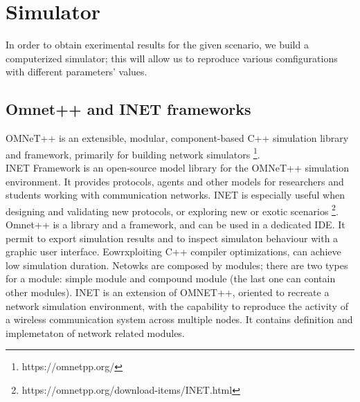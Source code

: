 %
\chapter{Simulator}
In order to obtain exerimental results for the given scenario, we build a computerized simulator;
this will allow us to reproduce various comfigurations with different parameters' values.\\
\section{Omnet++ and INET frameworks}
OMNeT++ is an extensible, modular, component-based C++ simulation library and framework, 
primarily for building network simulators \footnote{https://omnetpp.org/}.\\
INET Framework is an open-source model library for the OMNeT++ simulation environment. 
It provides protocols, agents and other models for researchers and students working with 
communication networks. INET is especially useful when designing and validating new protocols, 
or exploring new or exotic scenarios \footnote{https://omnetpp.org/download-items/INET.html}.\\
Omnet++ is a library and a framework, and can be used in a dedicated IDE. It permit to export simulation results
and to inspect simulaton behaviour with a graphic user interface. Eowrxploiting C++ compiler optimizations, can achieve low simulation duration.
Netowks are composed by modules; there are two types for a module: simple module and compound module (the last one can contain other modules).
INET is an extension of OMNET++, oriented to recreate a network simulation environment, with the capability to reproduce the activity
of a wireless communication system across multiple nodes. It contains definition and implemetaton of network related modules.

